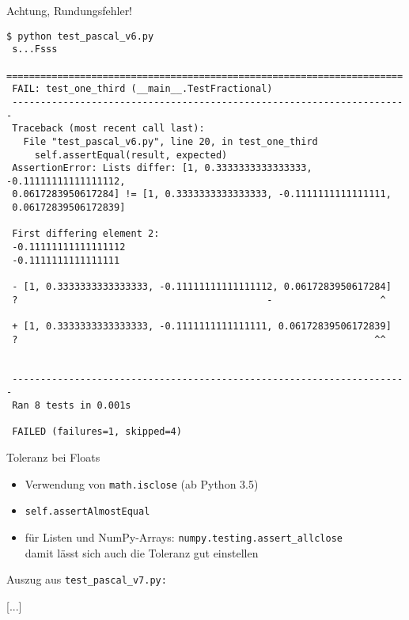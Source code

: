 \documentclass[t, utf8x, 10pt]{beamer}
\begin{document}
\begin{frame}[fragile]{Achtung, Rundungsfehler!}
 \begin{scriptsize}
  \begin{lstlisting}[language={}]
 $ python test_pascal_v6.py
 s...Fsss
 ======================================================================
 FAIL: test_one_third (__main__.TestFractional)
 ----------------------------------------------------------------------
 Traceback (most recent call last):
   File "test_pascal_v6.py", line 20, in test_one_third
     self.assertEqual(result, expected)
 AssertionError: Lists differ: [1, 0.3333333333333333, -0.11111111111111112,
 0.0617283950617284] != [1, 0.3333333333333333, -0.1111111111111111,
 0.06172839506172839]

 First differing element 2:
 -0.11111111111111112
 -0.1111111111111111

 - [1, 0.3333333333333333, -0.11111111111111112, 0.0617283950617284]
 ?                                            -                   ^

 + [1, 0.3333333333333333, -0.1111111111111111, 0.06172839506172839]
 ?                                                               ^^


 ----------------------------------------------------------------------
 Ran 8 tests in 0.001s

 FAILED (failures=1, skipped=4)
  \end{lstlisting}
 \end{scriptsize}
\end{frame}


\begin{frame}{Toleranz bei Floats}
 \begin{itemize}
  \item Verwendung von \texttt{math.isclose} (ab Python 3.5)
  \item \texttt{self.assertAlmostEqual}
  \item für Listen und NumPy-Arrays: \texttt{numpy.testing.assert\_allclose}\\
	damit lässt sich auch die Toleranz gut einstellen
 \end{itemize}

 Auszug aus \texttt{test\_pascal\_v7.py:}
 
 [...]
 

\end{frame}
\end{document}
